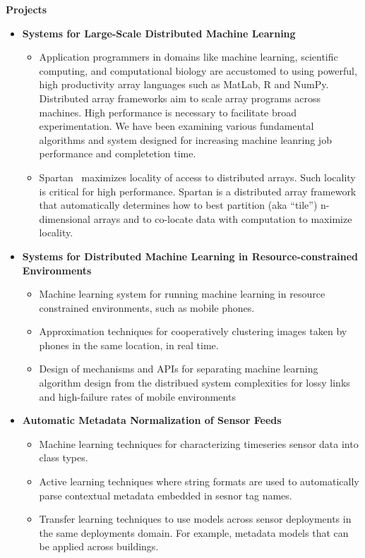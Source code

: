 \documentclass[letterpaper,11pt]{article}
\newcommand{\resitem}[1]{\item #1 \vspace{-2pt}}
\newcommand{\resheading}[1]{{\large \colorbox{mygrey}{\begin{minipage}{\textwidth}{\textbf{#1 \vphantom{p\^{E}}}}\end{minipage}}}}
\begin{document}
\resheading{Projects}
\begin{itemize}
    \item {\textbf{Systems for Large-Scale Distributed Machine Learning}}
            \begin{itemize}
                \resitem{Application programmers in domains like machine learning, scientific computing, and computational biology are accustomed to using powerful, high productivity array languages such as MatLab, R and NumPy. Distributed array frameworks aim to scale array programs across machines. High performance is necessary to facilitate broad experimentation.  We have been examining various fundamental algorithms and system designed for increasing machine leanring job performance and completetion time.}
                \resitem{Spartan~\cite{spartan} maximizes locality of access to distributed arrays. Such locality is critical for high performance.  Spartan is a distributed array framework that automatically determines how to best partition (aka “tile”) n-dimensional arrays and to co-locate data with computation to maximize locality.}
            \end{itemize}

    \item {\textbf{Systems for Distributed Machine Learning in Resource-constrained Environments}}
        \begin{itemize}
            \resitem{Machine learning system for running machine learning in resource constrained environments, such as mobile phones.}
            \resitem{Approximation techniques for cooperatively clustering images taken by phones in the same location, in real time.}
            \resitem{Design of mechanisms and APIs for separating machine learning algorithm design from the distribued system complexities for lossy links and high-failure rates of mobile environments} 
        \end{itemize}

    \item {\textbf{Automatic Metadata Normalization of Sensor Feeds}}
        \begin{itemize}
            \resitem{Machine learning techniques for characterizing timeseries sensor data into class types.}
            \resitem{Active learning techniques where string formats are used to automatically parse contextual metadata embedded in sesnor tag names.\cite{Arka_buildsys2015}}
            \resitem{Transfer learning techniques to use models across sensor deployments in the same deployments domain.  For example, metadata models that can be applied across buildings.~\cite{Fontugne:2013:SBS:2461381.2461399,Hong:2013:TAS:2528282.2528302,Dezhi_buildsys2015}}
        \end{itemize}
\end{itemize}
\end{document}
